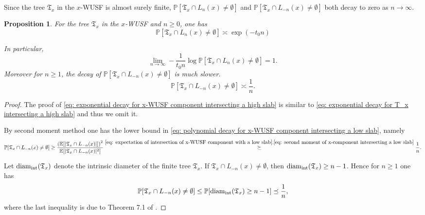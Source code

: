 \documentclass[12pt]{article}
\newtheorem{proposition}[theorem]{Proposition}
\numberwithin{equation}{section}
\newcommand{\be}{\begin{equation}}
\newcommand{\ee}{\end{equation}}
\newcommand{\1}{\mathbf{1}}
\begin{document}
Since the tree $\mathfrak{T}_x$ in the $x$-WUSF is almost surely finite, $\mathbb{P}[\mathfrak{T}_x\cap L_{n}(x)\neq \emptyset]$ and $\mathbb{P}[\mathfrak{T}_x\cap L_{-n}(x)\neq \emptyset]$  both decay to zero as $n\rightarrow\infty$. 
\begin{proposition}\label{prop: decay of probability for x-WUSF component insecting a slab far away}
	For the tree $\mathfrak{T}_x$ in the $x$-WUSF and $n\geq 0$, one  has
	\be\label{eq: exponential decay for x-WUSF component intersecting a high slab}
	\mathbb{P}[\mathfrak{T}_x\cap L_{n}(x)\neq \emptyset]\asymp \exp(-t_0n)
	\ee
	
	In particular,  
	\be
	\lim_{n\rightarrow\infty}-\frac{1}{t_0n}\log\mathbb{P}[\mathfrak{T}_x\cap L_{n}(x)\neq \emptyset]=1.
	\ee
	Moreover for $n\geq 1$, the decay of $\mathbb{P}[\mathfrak{T}_x\cap L_{-n}(x)\neq \emptyset]$ is much slower.
	\be\label{eq: polynomial decay for x-WUSF component intersecting a low slab}
	\mathbb{P}[\mathfrak{T}_x\cap L_{-n}(x)\neq \emptyset]\asymp\frac{1}{n}.
	\ee
\end{proposition}
\begin{proof}
	The proof of \eqref{eq: exponential decay for x-WUSF component intersecting a high slab} is similar to \eqref{eq: exponential decay for T_x intersecting a high slab} and thus we omit it.
	
	By second moment method one has the lower bound in \eqref{eq: polynomial decay for x-WUSF component intersecting a low slab}, namely 
	\[
	\mathbb{P}[\mathfrak{T}_x\cap L_{-n}(x)\neq \emptyset]\geq \frac{\left(\mathbb{E}[|\mathfrak{T}_x\cap L_{-n}(x)|]\right)^2}{\mathbb{E}[|\mathfrak{T}_x\cap L_{-n}(x)|^2]}
	\stackrel{\eqref{eq: expectation of intersection of x-WUSF component with a low slab},\eqref{eq: second moment of x-component intersecting a low slab}}{\succeq } \frac{1}{n}.
	\]
	
	Let $\textnormal{diam}_{\textnormal{int}}(\mathfrak{T}_x)$ denote the intrinsic diameter of the finite tree $\mathfrak{T}_x$. If $\mathfrak{T}_x\cap L_{-n}(x)\neq \emptyset$, then $\textnormal{diam}_{\textnormal{int}}(\mathfrak{T}_x)\geq n-1$. Hence for $n\geq 1$  one has 
	\[
	\mathbb{P}[\mathfrak{T}_x\cap L_{-n}(x)\neq \emptyset]\leq\mathbb{P}[\textnormal{diam}_{\textnormal{int}}(\mathfrak{T}_x)\geq n-1]\preceq\frac{1}{n},
	\]
	where the last inequality is due to Theorem 7.1 of \cite{Hutchcroft2018a}.
\end{proof}
\end{document}
